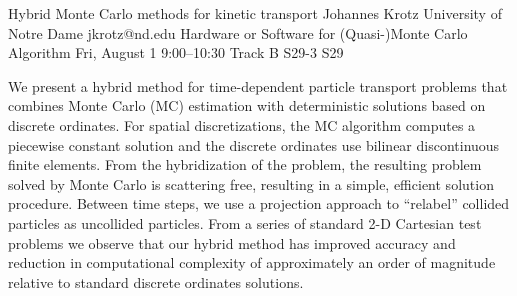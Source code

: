 \begin{talk}
  {Hybrid Monte Carlo methods for kinetic transport}%
  {Johannes Krotz}%
  {University of Notre Dame}%
  {jkrotz@nd.edu}%
  {Hardware or Software for (Quasi-)Monte Carlo Algorithm}%
  {}%
  {Fri, August 1 9:00–10:30 Track B}%
  {S29-3}%
  {S29}%
				
			

We present a hybrid method for time-dependent particle transport problems that combines Monte Carlo (MC) estimation with deterministic solutions based on discrete ordinates. For spatial discretizations, the MC algorithm computes a piecewise constant solution and the discrete ordinates use bilinear discontinuous finite elements. From the hybridization of the problem, the resulting problem solved by Monte Carlo is scattering free, resulting in a simple, efficient solution procedure. Between time steps, we use a projection approach to “relabel” collided particles as uncollided particles. From a series of standard 2-D Cartesian test problems we observe that our hybrid method has improved accuracy and reduction in computational complexity of approximately an order of magnitude relative to standard discrete ordinates solutions.

\end{talk}
